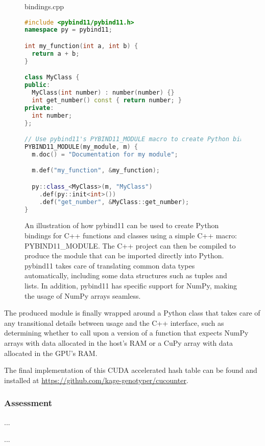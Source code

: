 \begin{figure}[H]
\begin{center}
bindings.cpp
\end{center}
\begin{lstlisting}[language=C++,style=cppcode]
#include <pybind11/pybind11.h>
namespace py = pybind11;

int my_function(int a, int b) {
  return a + b;
}

class MyClass {
public:
  MyClass(int number) : number(number) {}
  int get_number() const { return number; } 
private:
  int number;
};

// Use pybind11's PYBIND11_MODULE macro to create Python bindings for our simple function and class
PYBIND11_MODULE(my_module, m) {
  m.doc() = "Documentation for my module";

  m.def("my_function", &my_function);

  py::class_<MyClass>(m, "MyClass")
    .def(py::init<int>())
    .def("get_number", &MyClass::get_number);
}
\end{lstlisting}
\caption{
  An illustration of how pybind11 can be used to create Python bindings for C++ functions and classes using a simple C++ macro: PYBIND11\_MODULE.
  The C++ project can then be compiled to produce the module that can be imported directly into Python.
  pybind11 takes care of translating common data types automatically, including some data structures such as tuples and lists.
  In addition, pybind11 has specific support for NumPy, making the usage of NumPy arrays seamless.
}
\label{methods:gpu_accelerating_kmer_counting:figures:pybind11_example}
\end{figure}

The produced module is finally wrapped around a Python class that takes care of any transitional details between usage and the C++ interface, such as determining whether to call upon a version of a function that expects NumPy arrays with data allocated in the host's RAM or a CuPy array with data allocated in the GPU's RAM.

The final implementation of this CUDA accelerated hash table can be found and installed at \url{https://github.com/kage-genotyper/cucounter}.

\subsubsection{Assessment}
...

...
